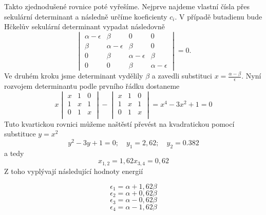 Takto zjednodušené rovnice poté vyřešíme. Nejprve najdeme vlastní čísla přes sekulární determinant a následně určíme koeficienty $c_i$. V případě butadienu bude H\"ckelův sekulární determinant vypadat následovně
\begin{equation}
\begin{vmatrix}
\alpha-\epsilon & \beta & 0 & 0  \\
\beta &\alpha-\epsilon & \beta & 0  \\
0 &\beta &\alpha-\epsilon & \beta  \\
0 & 0 & \beta &\alpha-\epsilon  
\end{vmatrix}
= 0.
\end{equation}
Ve druhém kroku jsme determinant vydělily $\beta$ a zavedli substituci $x=\frac{\alpha-\beta}{\epsilon}$.
Nyní rozvojem determinantu podle prvního řádku dostaneme
\begin{equation}
x
\begin{vmatrix}
x & 1 & 0 \\
1 & x & 1 \\
0 & 1 & x \\
\end{vmatrix}
-
\begin{vmatrix}
x & 1 & 0 \\
1 & x & 1 \\
0 & 1 & x \\
\end{vmatrix}
=x^4-3x^2+1=0
\end{equation}
Tuto kvartickou rovnici můžeme naštěstí převést na kvadratickou pomocí substituce $y=x^2$
\begin{equation}
y^2-3y+1=0;\quad y_1=2,62;\quad y_2=0.382
\end{equation}
a tedy
\begin{equation}
x_{1,2}=1,62 \nonumber
x_{3,4}=0,62 \nonumber
\end{equation}
Z toho vyplývají následující hodnoty energií

$$ \epsilon_1 = \alpha+1,62\beta $$
$$ \epsilon_2 = \alpha+0,62\beta $$
$$ \epsilon_3 = \alpha-0,62\beta $$
$$ \epsilon_4 = \alpha-1,62\beta $$

